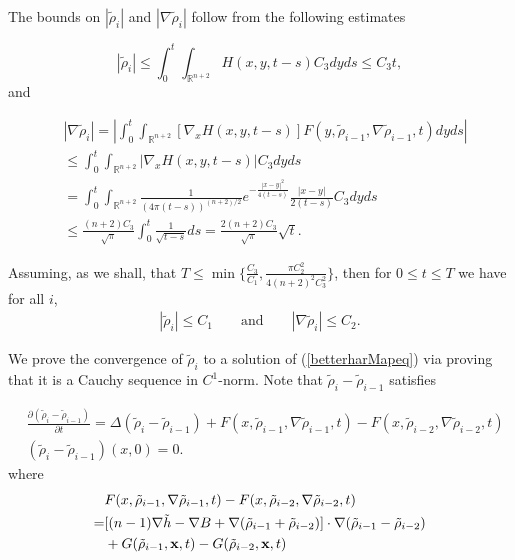 The bounds on $|\tilde{\rho}_{i}|$ and $|\nabla \tilde{\rho}_{i}|$
follow from the following estimates

\[
| \tilde{\rho}_i | \leq \int_0^t \int_{\mathbb{R}^{n+2}}
H(x,y,t-s)C_3 dyds \leq C_3t,
\]
and

\begin{align*}
& | \nabla \tilde{\rho}_i | = | \int_0^t \int_{\mathbb{R}^{n+2}}
[\nabla_x H(x,y,t-s)]
F(y,\tilde{\rho}_{i-1}, \nabla\tilde{\rho}_{i-1} ,t)dyds| \\
& \leq \int_0^t \int_{\mathbb{R}^{n+2}} | \nabla_x H(x,y,t-s)| C_3 dyds \\
& = \int_0^t \int_{\mathbb{R}^{n+2}} \frac{1}{(4 \pi
{(t-s)})^{(n+2)/2}}
e^{-\frac{|x-y|^2}{4{(t-s)}} } \frac{|x-y|}{2{(t-s)}}  C_3 dyds \\
& \leq \frac{(n+2)C_3}{\sqrt{\pi}} \int_0^t  \frac{1}{\sqrt{t-s}} ds
= \frac{2(n+2)C_3}{\sqrt{\pi}} \sqrt{t}.
\end{align*}

Assuming, as we shall, that $T\le   \min \{\frac{C_3}{C_1},\frac{\pi
C_2^2}{ 4(n+2)^2C_3^2} \}$, then for $0 \leq t \leq T$ we have for
all $i$,
\begin{align}
|\tilde{\rho}_{i}| \leq C_1 \qquad \text{and} \qquad  |\nabla
\tilde{\rho}_{i}| \leq C_2. \label{rho_i est}
\end{align}

We prove the convergence of $\tilde{\rho}_i$ to a solution of
(\ref{betterharMapeq}) via proving that it is a Cauchy sequence in
$C^1$-norm.  Note that $\tilde{\rho}_i- \tilde{\rho}_{i-1}$
satisfies

\begin{align}
& \frac{\partial (\tilde{\rho}_i- \tilde{\rho}_{i-1})}{\partial t} =
\Delta (\tilde{\rho}_i- \tilde{\rho}_{i-1}) + F(x,
\tilde{\rho}_{i-1},\nabla\tilde{\rho}_{i-1},t)-F(x,\tilde{\rho}_{i-2},
\nabla\tilde{\rho}_{i-2},t) \nonumber \\
& (\tilde{\rho}_i- \tilde{\rho}_{i-1})(x,0)=   0. \label{rhoiminus}
\end{align}
where
\begin{align*}
& F(x,
\tilde{\rho}_{i-1},\nabla\tilde{\rho}_{i-1},t)-F(x,\tilde{\rho
}_{i-2},\nabla\tilde{\rho}_{i-2},t) \\
= & [(n-1) \nabla \tilde{h}- \nabla B +\nabla (\tilde{\rho}_{i-1}+
\tilde{\rho}_{i-2})]
 \cdot \nabla(\tilde{\rho}_{i-1} - \tilde{\rho}_{i-2}) \\
& + G( \tilde{\rho}_{i-1},{\bf x},t)-G(\tilde{\rho}_{i-2},{\bf x},t)
\end{align*}

